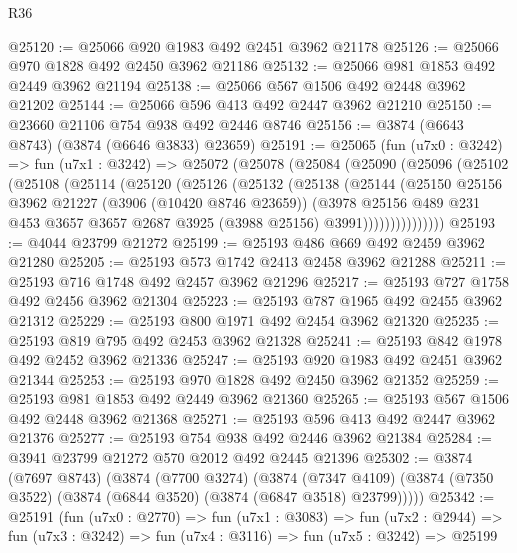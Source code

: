\begin{lexlean}{R36}
\begin{coremodule}
@25120 := @25066 @920 @1983 @492 @2451 @3962 @21178
@25126 := @25066 @970 @1828 @492 @2450 @3962 @21186
@25132 := @25066 @981 @1853 @492 @2449 @3962 @21194
@25138 := @25066 @567 @1506 @492 @2448 @3962 @21202
@25144 := @25066 @596 @413 @492 @2447 @3962 @21210
@25150 := @23660 @21106 @754 @938 @492 @2446 @8746
@25156 := @3874 (@6643 @8743) (@3874 (@6646 @3833) @23659)
@25191 := @25065
    (fun (u7x0 : @3242) =>
    fun (u7x1 : @3242) =>
    @25072
      (@25078
        (@25084
          (@25090
            (@25096
              (@25102
                (@25108
                  (@25114
                    (@25120
                      (@25126
                        (@25132
                          (@25138
                            (@25144
                              (@25150
                                @25156
                                @3962
                                @21227
                                (@3906 (@10420 @8746 @23659))
                                (@3978
                                  @25156
                                  @489
                                  @231
                                  @453
                                  @3657
                                  @3657
                                  @2687
                                  @3925
                                  (@3988 @25156)
                                  @3991)))))))))))))))
@25193 := @4044 @23799 @21272
@25199 := @25193 @486 @669 @492 @2459 @3962 @21280
@25205 := @25193 @573 @1742 @2413 @2458 @3962 @21288
@25211 := @25193 @716 @1748 @492 @2457 @3962 @21296
@25217 := @25193 @727 @1758 @492 @2456 @3962 @21304
@25223 := @25193 @787 @1965 @492 @2455 @3962 @21312
@25229 := @25193 @800 @1971 @492 @2454 @3962 @21320
@25235 := @25193 @819 @795 @492 @2453 @3962 @21328
@25241 := @25193 @842 @1978 @492 @2452 @3962 @21336
@25247 := @25193 @920 @1983 @492 @2451 @3962 @21344
@25253 := @25193 @970 @1828 @492 @2450 @3962 @21352
@25259 := @25193 @981 @1853 @492 @2449 @3962 @21360
@25265 := @25193 @567 @1506 @492 @2448 @3962 @21368
@25271 := @25193 @596 @413 @492 @2447 @3962 @21376
@25277 := @25193 @754 @938 @492 @2446 @3962 @21384
@25284 := @3941 @23799 @21272 @570 @2012 @492 @2445 @21396
@25302 := @3874
    (@7697 @8743)
    (@3874
      (@7700 @3274)
      (@3874
        (@7347 @4109)
        (@3874 (@7350 @3522) (@3874 (@6844 @3520) (@3874 (@6847 @3518) @23799)))))
@25342 := @25191
    (fun (u7x0 : @2770) =>
    fun (u7x1 : @3083) =>
    fun (u7x2 : @2944) =>
    fun (u7x3 : @3242) =>
    fun (u7x4 : @3116) =>
    fun (u7x5 : @3242) =>
    @25199

\end{coremodule}
\end{lexlean}
